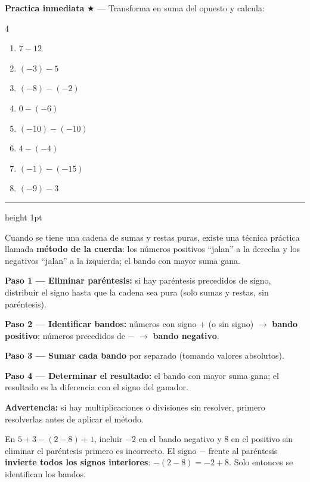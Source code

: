 \documentclass[11pt, letterpaper]{article}
\newcommand{\subbloque}[1]{%
  \vspace{14pt}
  \noindent{\large\bfseries\color{zenitnavy} #1}\par
  \vspace{4pt}\hrule height 1pt\vspace{8pt}}
\begin{document}
\medskip
\textbf{Practica inmediata} \quad $\bigstar$ --- Transforma en suma del opuesto y calcula:
\begin{multicols}{4}
\begin{enumerate}[label=\alph*), leftmargin=*]
  \item $7-12$
  \item $(-3)-5$
  \item $(-8)-(-2)$
  \item $0-(-6)$
  \item $(-10)-(-10)$
  \item $4-(-4)$
  \item $(-1)-(-15)$
  \item $(-9)-3$
\end{enumerate}
\end{multicols}

\subbloque{2.3 El m\'etodo de la cuerda}
\label{sub:2.3}

Cuando se tiene una cadena de sumas y restas puras, existe una t\'ecnica pr\'actica llamada \textbf{m\'etodo de la cuerda}: los n\'umeros positivos ``jalan'' a la derecha y los negativos ``jalan'' a la izquierda; el bando con mayor suma gana.

\begin{tcolorbox}[importantbox, title={M\'etodo de la cuerda --- procedimiento}]
\textbf{Paso 1 --- Eliminar par\'entesis:} si hay par\'entesis precedidos de signo, distribuir el signo hasta que la cadena sea pura (solo sumas y restas, sin par\'entesis).

\textbf{Paso 2 --- Identificar bandos:} n\'umeros con signo $+$ (o sin signo) $\to$ \textbf{bando positivo}; n\'umeros precedidos de $-$ $\to$ \textbf{bando negativo}.

\textbf{Paso 3 --- Sumar cada bando} por separado (tomando valores absolutos).

\textbf{Paso 4 --- Determinar el resultado:} el bando con mayor suma gana; el resultado es la diferencia con el signo del ganador.

\textbf{Advertencia:} si hay multiplicaciones o divisiones sin resolver, primero resolverlas antes de aplicar el m\'etodo.
\end{tcolorbox}

\begin{tcolorbox}[warningbox, title={Error frecuente --- aplicar el m\'etodo sin eliminar par\'entesis}]
En $5+3-(2-8)+1$, incluir $-2$ en el bando negativo y $8$ en el positivo sin eliminar el par\'entesis primero es incorrecto. El signo $-$ frente al par\'entesis \textbf{invierte todos los signos interiores}: $-(2-8)=-2+8$. Solo entonces se identifican los bandos.
\end{tcolorbox}
\end{document}
